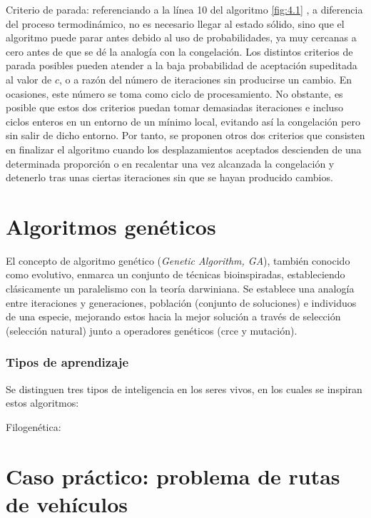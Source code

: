 Criterio de parada: referenciando a la línea 10 del algoritmo \ref{fig:4.1}
, a diferencia del proceso termodinámico, no es necesario llegar al estado sólido, sino que el algoritmo puede parar antes debido al uso de probabilidades, ya muy cercanas a cero antes de que se dé la analogía con la congelación. Los distintos criterios de parada posibles pueden atender a la baja probabilidad de aceptación supeditada al valor de $c$, o a razón del número de iteraciones sin producirse un cambio. En ocasiones, este número se toma como ciclo de procesamiento.
No obstante, es posible que estos dos criterios puedan tomar demasiadas iteraciones e incluso ciclos enteros en un entorno de un mínimo local, evitando así la congelación pero sin salir de dicho entorno.
Por tanto, se proponen otros dos criterios que consisten en finalizar el algoritmo cuando los desplazamientos aceptados descienden de una determinada proporción o en recalentar una vez alcanzada la congelación y detenerlo tras unas ciertas iteraciones sin que se hayan producido cambios.


\section{Algoritmos genéticos}

El concepto de algoritmo genético (\textsl{Genetic Algorithm, GA}), también conocido como evolutivo, enmarca un conjunto de técnicas bioinspiradas, estableciendo clásicamente un paralelismo con la teoría darwiniana. Se establece una analogía entre iteraciones y generaciones, población (conjunto de soluciones) e individuos de una especie, mejorando estos hacia la mejor solución a través de selección (selección natural) junto a operadores genéticos (crce y mutación).

\subsubsection{Tipos de aprendizaje}
Se distinguen tres tipos de inteligencia en los seres vivos, en los cuales se inspiran estos algoritmos:

Filogenética: 
\section{Caso práctico: problema de rutas de vehículos}



